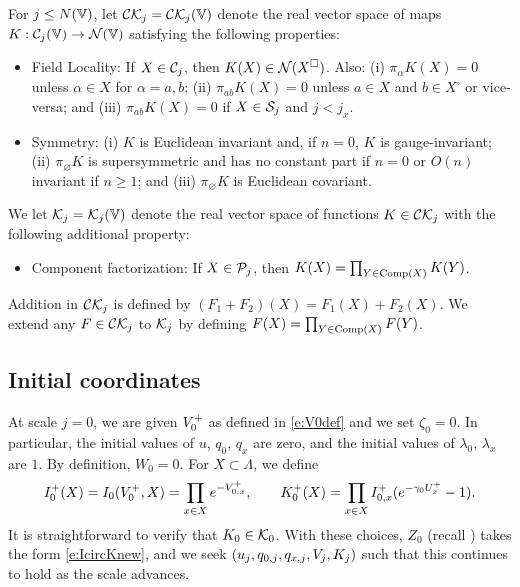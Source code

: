 \begin{defn}
For $j \le N(\mathbb{V})$, let $\mathcal{C}\mathcal{K}_j = \mathcal{C}\mathcal{K}_j(\mathbb{V})$ denote the real
vector space of maps $K : \mathcal{C}_j(\mathbb{V}) \rightarrow \mathcal{N}(\mathbb{V})$ satisfying the following
properties:
\begin{itemize}
\item
Field Locality: If $X \in \mathcal{C}_j$, then $K(X) \in \mathcal{N}(X^\square)$.
Also: (i) $\pi_\alpha K(X) = 0$ unless $\alpha \in X$ for $\alpha = a, b$;
(ii) $\pi_{ab} K(X) = 0$ unless $a\in X$ and $b \in X^\square$ or vice-versa;
and (iii) $\pi_{ab} K(X) = 0$ if $X \in \mathcal{S}_j$ and $j < j_x$.

\item
Symmetry: (i) $K$ is Euclidean invariant and, if $n = 0$, $K$ is gauge-invariant;
(ii) $\pi_\varnothing K$ is supersymmetric and has no constant part if $n = 0$
or $O(n)$ invariant if $n \ge 1$;
and (iii) $\pi_\varnothing K$ is Euclidean covariant.
\end{itemize}
We let $\mathcal{K}_j = \mathcal{K}_j(\mathbb{V})$ denote the real vector space of functions
$K \in \mathcal{C}\mathcal{K}_j$ with the following additional property:
\begin{itemize}
\item
Component factorization: If $X \in \mathcal{P}_j$, then $K(X) = \prod_{Y\in{\rm Comp}(X)} K(Y)$.
\end{itemize}
\end{defn}

Addition in $\mathcal{C}\mathcal{K}_j$ is defined by $(F_1 + F_2)(X) = F_1(X) + F_2(X)$.
We extend any $F \in \mathcal{C}\mathcal{K}_j$ to $\mathcal{K}_j$ by defining
$F(X) = \prod_{Y\in{\rm Comp}(X)} F(Y)$.

\subsection{Initial coordinates}

At scale $j = 0$, we are given $V^+_0$ as defined in \eqref{e:V0def}
and we set $\zeta_0 = 0$. In particular,
the initial values of $u$, $q_0$, $q_x$ are zero, and the initial values of $\lambda_0$, $\lambda_x$
are $1$. By definition, $W_0 = 0$.
For $X \subset \Lambda$, we define
\begin{equation}
\label{e:IK0def}
I_0^+(X) = I_0(V^+_0, X) = \prod_{x\in X} e^{-V^+_{0,x}},
	\qquad
K_0^+(X) = \prod_{x \in X} I_{0,x}^+ (e^{-\gamma_0 U^{+}_{x}} - 1).
\end{equation}
It is straightforward to verify that $K_0 \in \mathcal{K}_0$.
With these choices, $Z_0$ (recall )
takes the form \eqref{e:IcircKnew}, and we seek
$(u_j, q_{0,j}, q_{x,j}, V_j, K_j)$ such that this continues to hold as the scale advances.

